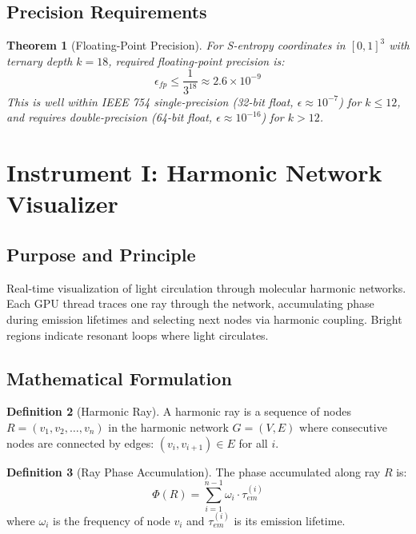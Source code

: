 \documentclass[11pt,a4paper]{article}
\newtheorem{theorem}{Theorem}[section]
\theoremstyle{definition}
\newtheorem{definition}[theorem]{Definition}
\theoremstyle{remark}
\begin{document}
\subsection{Precision Requirements}

\begin{theorem}[Floating-Point Precision]
\label{thm:fp_precision}
For S-entropy coordinates in $[0,1]^3$ with ternary depth $k=18$, required floating-point precision is:
\begin{equation}
\epsilon_{fp} \leq \frac{1}{3^{18}} \approx 2.6 \times 10^{-9}
\end{equation}
This is well within IEEE 754 single-precision (32-bit float, $\epsilon \approx 10^{-7}$) for $k \leq 12$, and requires double-precision (64-bit float, $\epsilon \approx 10^{-16}$) for $k > 12$.
\end{theorem}

\section{Instrument I: Harmonic Network Visualizer}
\label{sec:instrument1}

\subsection{Purpose and Principle}

Real-time visualization of light circulation through molecular harmonic networks. Each GPU thread traces one ray through the network, accumulating phase during emission lifetimes and selecting next nodes via harmonic coupling. Bright regions indicate resonant loops where light circulates.

\subsection{Mathematical Formulation}

\begin{definition}[Harmonic Ray]
\label{def:harmonic_ray}
A harmonic ray is a sequence of nodes $R = (v_1, v_2, \ldots, v_n)$ in the harmonic network $G = (V, E)$ where consecutive nodes are connected by edges: $(v_i, v_{i+1}) \in E$ for all $i$.
\end{definition}

\begin{definition}[Ray Phase Accumulation]
\label{def:ray_phase}
The phase accumulated along ray $R$ is:
\begin{equation}
\Phi(R) = \sum_{i=1}^{n-1} \omega_i \cdot \tau_{em}^{(i)}
\end{equation}
where $\omega_i$ is the frequency of node $v_i$ and $\tau_{em}^{(i)}$ is its emission lifetime.
\end{definition}
\end{document}
